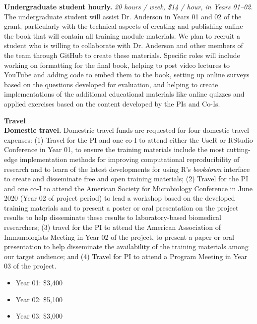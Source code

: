 \documentclass[pdftex,english,11pt,parskip=half]{scrartcl}
\begin{document}
\noindent \textbf{Undergraduate student hourly.} \textit{20 hours / week, \$14 / hour, in Years 01--02.} The undergraduate student will assist Dr. Anderson in Years 01 and 02 of the grant, particularly with the technical aspects of creating and publishing online the book that will contain all training module materials. We plan to recruit a student who is willing to collaborate with Dr. Anderson and other members of the team through GitHub to create these materials. Specific roles will include working on formatting for the final book, helping to post video lectures to YouTube and adding code to embed them to the book, setting up online surveys based on the questions developed for evaluation, and helping to create implementations of the additional educational materials like online quizzes and applied exercises based on the content developed by the PIs and Co-Is. 

{\large \textbf{Travel}} \\

\noindent \textbf{Domestic travel.} Domestric travel funds are requested for four domestic travel expenses: (1) Travel for the PI and one co-I to attend either the UseR or RStudio Conference in Year 01, to ensure the training materials include the most cutting-edge implementation methods for improving computational reproducibility of research and to learn of the latest developments for using R's \textit{bookdown} interface to create and disseminate free and open training materials; (2) Travel for the PI and one co-I to attend the American Society for Microbiology Conference in June 2020 (Year 02 of project period) to lead a workshop based on the developed training materials and to present a poster or oral presentation on the project results to help disseminate these results to laboratory-based biomedical researchers; (3) travel for the PI to attend the American Association of Immunologists Meeting in Year 02 of the project, to present a paper or oral presentation to help disseminate the availability of the training materials among our target audience; and (4) Travel for PI to attend a Program Meeting in Year 03 of the project. 
\begin{itemize}
\item Year 01: \$3,400
\item Year 02: \$5,100
\item Year 03: \$3,000
\end{itemize}
\end{document}
